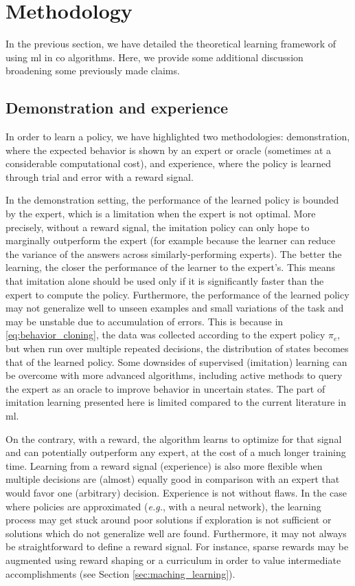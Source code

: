 \documentclass[11pt]{article}
\begin{document}
\section{Methodology}
	\label{sec:methodology}
	In the previous section, we have detailed the theoretical learning framework of using \gls{ml} in
	\gls{co} algorithms.
	Here, we provide some additional discussion broadening some previously made claims.

	\subsection{Demonstration and experience}
		\label{sec:demonstration_and_experience}
		In order to learn a policy, we have highlighted two methodologies: demonstration, where the
		expected behavior is shown by an expert or oracle (sometimes at a considerable computational cost),
		and experience, where the policy is learned through trial and error with a reward signal.

		In the demonstration setting, the performance of the learned policy is bounded by the expert, which
		is a limitation when the expert is not optimal.
		More precisely, without a reward signal, the imitation policy can only hope to marginally
		outperform the expert (for example because the learner can reduce the variance of the answers across similarly-performing experts).
		The better the learning, the closer the performance of the learner to the expert's.
		This means that imitation alone should be used only if it is significantly faster than the expert
		to compute the policy.
		Furthermore, the performance of the learned policy may not generalize well to unseen examples and
		small variations of the task and may be unstable due to accumulation of errors.
		This is because in \eqref{eq:behavior_cloning}, the data was collected according to the
		expert policy $\pi_e$, but when run over multiple repeated decisions, the distribution of states
		becomes that of the learned policy.
		Some downsides of supervised (imitation) learning can be overcome with more advanced algorithms,
		including active methods to query the expert as an oracle to improve behavior in uncertain states.
		The part of imitation learning presented here is limited compared to the current literature
		in \gls{ml}.

		On the contrary, with a reward, the algorithm learns to optimize for that signal and can
		potentially outperform any expert, at the cost of a much longer training time.
		Learning from a reward signal (experience) is also more flexible when multiple decisions are
		(almost) equally good in comparison with an expert that would favor one (arbitrary) decision.
		Experience is not without flaws.
		In the case where policies are approximated (\textit{e.g.}, with a neural network), the learning
		process may get stuck around poor solutions if exploration is not sufficient or solutions which do
		not generalize well are found.
		Furthermore, it may not always be straightforward to define a reward signal.
		For instance, sparse rewards may be augmented using reward shaping or a curriculum in order to
		value intermediate accomplishments (see Section \ref{sec:maching_learning}).
\end{document}
